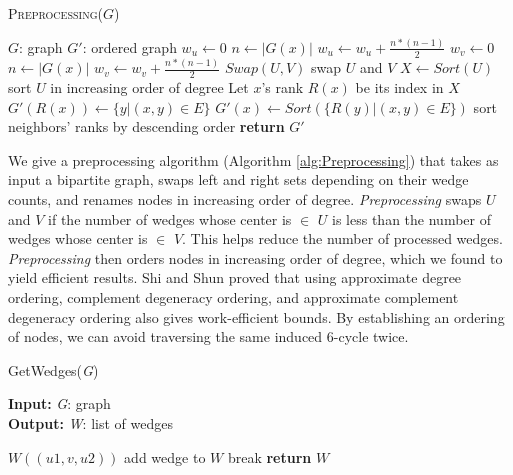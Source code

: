 \documentclass[11pt]{article}
\begin{document}
\setlength{\textfloatsep}{0pt}
\begin{algorithm}[H]
\caption{\textsc{Preprocessing($G$)}}
\label{alg:Preprocessing}
\begin{algorithmic}[1]
    \Input $G$: graph
    \Output $G'$: ordered graph
        \State $w_u \gets 0$
            \State $n \gets |G(x)|$
            \State $w_u \gets w_u + \frac{n * (n - 1)}{2}$
        \EndFor
        \State $w_v \gets 0$
            \State $n \gets |G(x)|$
            \State $w_v \gets w_v + \frac{n * (n - 1)}{2}$
        \EndFor
            \State $Swap(U, V)$ \Comment swap $U$ and $V$
        \EndIf
        \State $X \gets Sort(U)$ \Comment sort $U$ in increasing order of degree
        \State Let $x$'s rank $R(x)$ be its index in $X$
                \State $G'(R(x)) \gets \{y | (x, y) \in E\}$
            \Else
                \State $G'(x) \gets Sort(\{R(y) | (x, y) \in E\})$ \Comment sort neighbors' ranks by descending order
            \EndIf
        \EndFor
        \State \textbf{return} $G'$
\end{algorithmic}
\end{algorithm}

We give a preprocessing algorithm (Algorithm \ref{alg:Preprocessing}) that takes as input a bipartite graph, swaps left and right sets depending on their wedge counts, and renames nodes in increasing order of degree.
\textit{Preprocessing} swaps $U$ and $V$ if the number of wedges whose center is $\in$ $U$ is less than the number of wedges whose center is $\in$ $V$.
This helps reduce the number of processed wedges.
\textit{Preprocessing} then orders nodes in increasing order of degree, which we found to yield efficient results.
Shi and Shun \cite{shi2019parallel} proved that using approximate degree ordering, complement degeneracy ordering, and approximate complement degeneracy ordering also gives work-efficient bounds.
By establishing an ordering of nodes, we can avoid traversing the same induced 6-cycle twice.

\begin{algorithm}[H]
\caption{GetWedges(\textit{G})}
\label{alg:GetWedges}
\hspace*{\algorithmicindent} \textbf{Input:} \textit{G}: graph \\
\hspace*{\algorithmicindent} \textbf{Output:} \textit{W}: list of wedges
\begin{algorithmic}[1]
                    \State $W((u1, v, u2))$ \Comment add wedge to $W$
                \Else
                    \State break
                \EndIf
            \EndFor
        \EndFor
    \EndFor
    \State \textbf{return} $W$
\end{algorithmic}
\end{algorithm}
\end{document}
